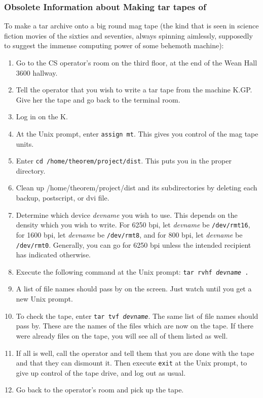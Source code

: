 \subsubsection{Obsolete Information about Making tar tapes of \TPS}

To make a tar archive onto a big round mag tape (the kind that is seen
in science fiction movies of the sixties and seventies, always
spinning aimlessly, supposedly to suggest the immense computing power
of some behemoth machine):
\begin{enumerate}
\item Go to the CS operator's room on the third floor, at the end of the
Wean Hall 3600 hallway.  

\item Tell the operator that you wish to write a tar tape from the machine
K.GP.  Give her the tape and go back to the terminal room. 

\item Log in on the K.

\item At the Unix prompt, enter {\tt assign mt}.  This gives you control of
the mag tape units.  

\item Enter {\tt cd /home/theorem/project/dist}.  This puts you in the proper
directory.

\item Clean up /home/theorem/project/dist and its subdirectories by deleting
each backup, postscript, or dvi file.

\item Determine which device {\it devname} you wish to use.  This depends on the 
density which you wish to write.  For 6250 bpi, let {\it devname} be
{\tt /dev/rmt16}, for 1600 bpi, let {\it devname} be {\tt /dev/rmt8}, and
for 800 bpi, let {\it devname} be {\tt /dev/rmt0}.  Generally, you can go
for 6250 bpi unless the intended recipient has indicated otherwise.

\item Execute the following command at the Unix prompt:
{\tt tar rvhf {\it devname} .}

\item A list of file names should pass by on the screen.  Just watch until
you get a new Unix prompt.

\item To check the tape, enter
{\tt tar tvf {\it devname}}.
The same list of file names should pass by.  These are the names of
the files which are now on the tape.  If there were already files on
the tape, you will see all of them listed as well.

\item If all is well, call the operator and tell them that you are done with
the tape and that they can dismount it.  Then execute {\tt exit} at the
Unix prompt, to give up control of the tape drive, and log out as usual.

\item Go back to the operator's room and pick up the tape.

\end{enumerate}

